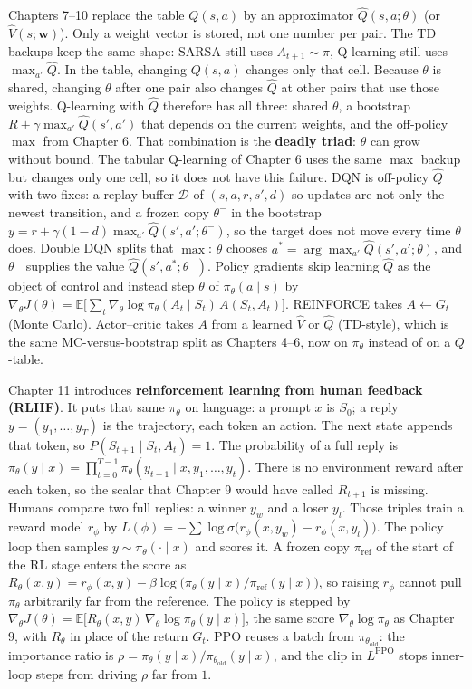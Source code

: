 Chapters 7--10 replace the table $Q(s,a)$ by an approximator $\hat{Q}(s,a;\theta)$ (or $\hat{V}(s;\mathbf{w})$). Only a weight vector is stored, not one number per pair. The TD backups keep the same shape: SARSA still uses $A_{t+1}\sim\pi$, Q-learning still uses $\max_{a'}\hat{Q}$. In the table, changing $Q(s,a)$ changes only that cell. Because $\theta$ is shared, changing $\theta$ after one pair also changes $\hat{Q}$ at other pairs that use those weights. Q-learning with $\hat{Q}$ therefore has all three: shared $\theta$, a bootstrap $R+\gamma\max_{a'}\hat{Q}(s',a')$ that depends on the current weights, and the off-policy $\max$ from Chapter 6. That combination is the \textbf{deadly triad}: $\theta$ can grow without bound. The tabular Q-learning of Chapter 6 uses the same $\max$ backup but changes only one cell, so it does not have this failure. DQN is off-policy $\hat{Q}$ with two fixes: a replay buffer $\mathcal{D}$ of $(s,a,r,s',d)$ so updates are not only the newest transition, and a frozen copy $\theta^-$ in the bootstrap $y=r+\gamma(1-d)\max_{a'}\hat{Q}(s',a';\theta^-)$, so the target does not move every time $\theta$ does. Double DQN splits that $\max$: $\theta$ chooses $a^*=\arg\max_{a'}\hat{Q}(s',a';\theta)$, and $\theta^-$ supplies the value $\hat{Q}(s',a^*;\theta^-)$. Policy gradients skip learning $\hat{Q}$ as the object of control and instead step $\theta$ of $\pi_\theta(a\mid s)$ by $\nabla_\theta J(\theta)=\mathbb{E}\bigl[\sum_t\nabla_\theta\log\pi_\theta(A_t\mid S_t)\,A(S_t,A_t)\bigr]$. REINFORCE takes $A\leftarrow G_t$ (Monte Carlo). Actor--critic takes $A$ from a learned $\hat{V}$ or $\hat{Q}$ (TD-style), which is the same MC-versus-bootstrap split as Chapters 4--6, now on $\pi_\theta$ instead of on a $Q$-table.

Chapter 11 introduces \textbf{reinforcement learning from human feedback (RLHF)}. It puts that same $\pi_\theta$ on language: a prompt $x$ is $S_0$; a reply $y=(y_1,\ldots,y_T)$ is the trajectory, each token an action. The next state appends that token, so $P(S_{t+1}\mid S_t,A_t)=1$. The probability of a full reply is $\pi_\theta(y\mid x)=\prod_{t=0}^{T-1}\pi_\theta(y_{t+1}\mid x,y_1,\ldots,y_t)$. There is no environment reward after each token, so the scalar that Chapter 9 would have called $R_{t+1}$ is missing. Humans compare two full replies: a winner $y_w$ and a loser $y_l$. Those triples train a reward model $r_\phi$ by $L(\phi)=-\sum\log\sigma\bigl(r_\phi(x,y_w)-r_\phi(x,y_l)\bigr)$. The policy loop then samples $y\sim\pi_\theta(\cdot\mid x)$ and scores it. A frozen copy $\pi_{\mathrm{ref}}$ of the start of the RL stage enters the score as $R_\theta(x,y)=r_\phi(x,y)-\beta\log\bigl(\pi_\theta(y\mid x)/\pi_{\mathrm{ref}}(y\mid x)\bigr)$, so raising $r_\phi$ cannot pull $\pi_\theta$ arbitrarily far from the reference. The policy is stepped by $\nabla_\theta J(\theta)=\mathbb{E}\bigl[R_\theta(x,y)\,\nabla_\theta\log\pi_\theta(y\mid x)\bigr]$, the same score $\nabla_\theta\log\pi_\theta$ as Chapter 9, with $R_\theta$ in place of the return $G_t$. PPO reuses a batch from $\pi_{\theta_{\mathrm{old}}}$: the importance ratio is $\rho=\pi_\theta(y\mid x)/\pi_{\theta_{\mathrm{old}}}(y\mid x)$, and the clip in $L^{\mathrm{PPO}}$ stops inner-loop steps from driving $\rho$ far from $1$.

